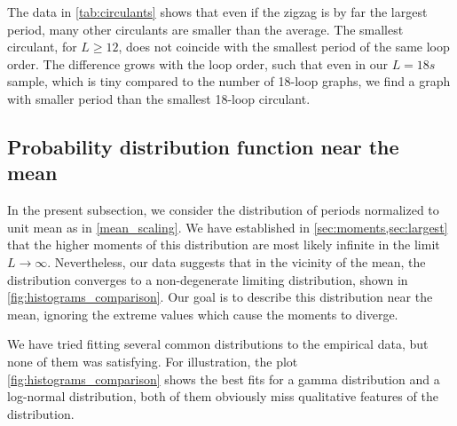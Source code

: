 \documentclass[11pt,a4paper]{article}
\renewcommand{\|}{\rule[-0.4ex]{0.2ex}{1.2em}}
\begin{document}
The data in \cref{tab:circulants} shows that even if the zigzag is by far the largest period, many other circulants are smaller than the average. The smallest circulant, for $L \geq 12$, does not coincide with the smallest period of the same loop order. The difference grows with the loop order, such that even in our $L=18s$ sample, which is tiny compared to the number of 18-loop graphs, we find a graph with smaller period than the smallest 18-loop circulant. 



\FloatBarrier


\subsection{Probability distribution function near the mean}\label{sec:distribution_central}

In the present subsection, we consider the distribution of periods normalized to unit mean as in \cref{mean_scaling}.
We have established in \cref{sec:moments,sec:largest} that the higher moments of this  distribution  are most likely infinite in the limit $L\rightarrow \infty$. Nevertheless, our data suggests that in the vicinity of the mean, the distribution  converges to a non-degenerate limiting distribution, shown in \cref{fig:histograms_comparison}. Our goal is to describe this distribution near the mean, ignoring the extreme values which cause the moments to diverge. 

We have tried fitting several common distributions to the empirical data, but none of them was satisfying. For illustration, the plot \cref{fig:histograms_comparison} shows the best fits for a gamma distribution and a log-normal distribution, both of them obviously miss qualitative features of the distribution.
\end{document}
